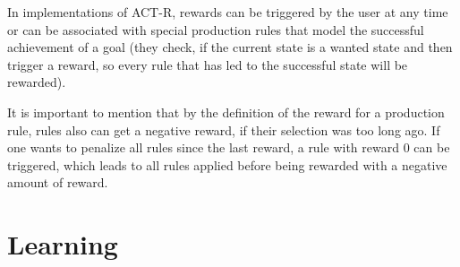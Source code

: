 In implementations of ACT-R, rewards can be triggered by the user at any time or can be associated with special production rules that model the successful achievement of a goal (they check, if the current state is a wanted state and then trigger a reward, so every rule that has led to the successful state will be rewarded).

It is important to mention that by the definition of the reward for a production rule, rules also can get a negative reward, if their selection was too long ago. If one wants to penalize all rules since the last reward, a rule with reward 0 can be triggered, which leads to all rules applied before being rewarded with a negative amount of reward.




\section{Learning}

\cite[pp. 92--95]{anderson_how_2007}
\cite[chapter 4]{whitehill_understanding}

